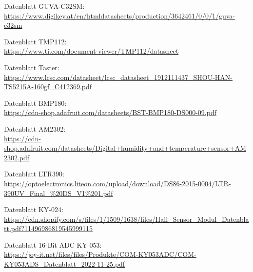 Datenblatt GUVA-C32SM:\\
\url{https://www.digikey.at/en/htmldatasheets/production/3642461/0/0/1/guva-c32sm}\\
\vspace{3mm}

Datenblatt TMP112:\\
\url{https://www.ti.com/document-viewer/TMP112/datasheet}\\
\vspace{3mm}

Datenblatt Taster:\\
\url{https://www.lcsc.com/datasheet/lcsc_datasheet_1912111437_SHOU-HAN-TS5215A-160gf_C412369.pdf}\\
\vspace{3mm}

Datenblatt BMP180:\\
\url{https://cdn-shop.adafruit.com/datasheets/BST-BMP180-DS000-09.pdf}\\
\vspace{3mm}

Datenblatt AM2302:\\
\url{https://cdn-shop.adafruit.com/datasheets/Digital+humidity+and+temperature+sensor+AM2302.pdf}
\vspace{3mm}

Datenblatt LTR390:\\
\url{https://optoelectronics.liteon.com/upload/download/DS86-2015-0004/LTR-390UV_Final_%20DS_V1%201.pdf}\\
\vspace{3mm}

Datenblatt KY-024:\\
\url{https://cdn.shopify.com/s/files/1/1509/1638/files/Hall_Sensor_Modul_Datenblatt.pdf?11496986819545999115}\\
\vspace{3mm}

Datenblatt 16-Bit ADC KY-053:\\
\url{https://joy-it.net/files/files/Produkte/COM-KY053ADC/COM-KY053ADS_Datenblatt_2022-11-25.pdf}\\

